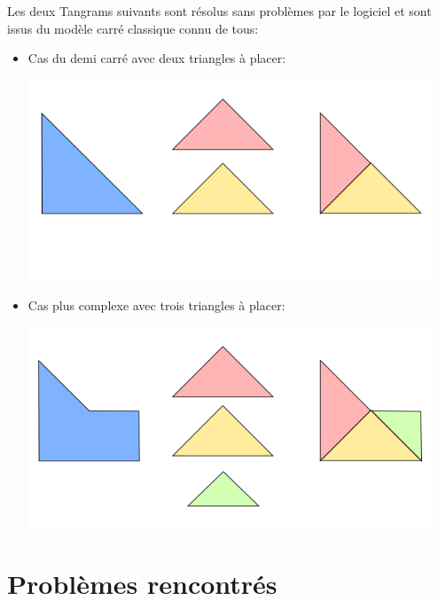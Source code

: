 \documentclass[a4paper, 11pt]{report}
\begin{document}
	Les deux Tangrams suivants sont résolus sans problèmes par le logiciel et sont issus du modèle carré classique connu de tous:
	\begin{itemize}
		\item Cas du demi carré avec deux triangles à placer:
		\begin{center}
			\includegraphics[width=12cm]{resultat_1}\\
		\end{center}
		\item Cas plus complexe avec trois triangles à placer:
		\begin{center}
			\includegraphics[width=12cm]{resultat_2}
		\end{center}
	\end{itemize}
	
	\chapter{Problèmes rencontrés}
	
\end{document}
